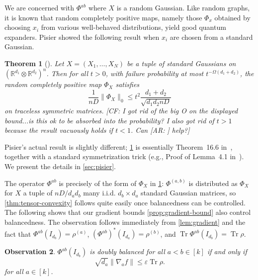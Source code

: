 \documentclass[aos]{imsart}
\newtheorem{theorem}{Theorem}[section]
\newtheorem{obs}[theorem]{Observation}
\theoremstyle{definition}
\numberwithin{equation}{section}
\DeclareMathOperator{\tr}{Tr}
\newcommand{\R}{{\mathbb{R}}}
\newcommand{\ot}{\otimes}
\newcommand{\eps}{\varepsilon}
\newcommand{\samp}{x}
\newcommand{\rv}{X}
\newcommand{\CF}[1]{{\color{purple}[CF: #1]}}
\newcommand{\AR}[1]{{\color{orange}[AR: #1]}}
\begin{document}
We are concerned with $\Phi^{ab}$ where $\rv$ is a random Gaussian.  Like random graphs, it is known that random completely positive maps, namely those $\Phi_\samp$ obtained by choosing $x_i$ from various well-behaved distributions, yield good quantum expanders. Pisier showed the following result when $x_i$ are chosen from a standard Gaussian. 


\begin{theorem}[\cite{pisier2012grothendieck, P14}]\label{thm:hess-pisier} Let $X = (X_1, \dots, X_N)$ be a tuple of standard Gaussians on $(\R^{d_1}\ot \R^{d_2})^n$. Then for all $t >0$, with failure probability at most $t^{-\Omega(d_{1} + d_{2})}$, the random completely positive map $\Phi_X$ satisfies 
$$\frac{1}{nD}\|\Phi_{X}\|_0 \leq t^{2} \frac{d_{1}+d_{2}}{\sqrt{d_{1} d_{2} nD}}$$ on traceless symmetric matrices. \CF{I got rid of the big O on the displayed bound...is this ok to be absorbed into the probability? I also got rid of $t > 1$ because the result vacuously holds if $t < 1$. Can \AR{} help?}\end{theorem} 


Pisier's actual result is slightly different; \cref{thm:hess-pisier} is essentially Theorem~16.6 in~\cite{pisier2012grothendieck}, together with a standard symmetrization trick (e.g., Proof of Lemma~4.1 in~\cite{P14}). We present the details in \cref{sec:pisier}. 

The operator $\Phi^{ab}$ is precisely of the form of $\Phi_{\rv}$ in \cref{thm:hess-pisier}: $\Phi^{(a,b)}$ is distributed as $\Phi_{\rv}$ for $\rv$ a tuple of $n D/d_a d_b$ many i.i.d. $d_b \times d_a $ standard Gaussian matrices, so \cref{thm:tensor-convexity} follows quite easily once balancedness can be controlled. The following shows that our gradient bounds \cref{prop:gradient-bound} also control balancedness. The observation follows immediately from \cref{lem:gradient} and the fact that $\Phi^{ab}(I_{d_b}) = \rho^{(a)}$, $(\Phi^{ab})^*(I_{d_a}) = \rho^{(b)}$, and $\tr \Phi^{ab}(I_{d_b}) = \tr \rho$.
\begin{obs}\label{obs:doubly-gradient}
$\Phi^{ab}(I_{d_b})$ is doubly balanced for all $a<b \in [k]$ if and only if 
$$\sqrt{d_a} \| \nabla_a f\| \leq \eps \tr \rho.$$
for all $a \in [k]$.
\end{obs}
\end{document}
